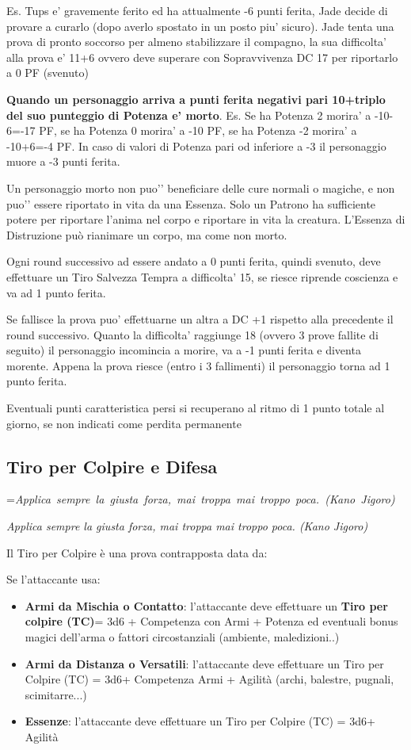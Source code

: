 \documentclass[a4paper,11pt,twoside,openany]{book}
\makeatletter
\newcommand{\mybox}[1]{%
	\setbox0=\hbox{#1}%
	\setlength{\@tempdima}{\dimexpr\wd0+13pt}%
	\begin{tcolorbox}[boxrule=0.5pt,arc=4pt, breakable,enhanced,
		left=6pt,right=6pt,top=6pt,bottom=6pt,boxsep=0pt,width=\@tempdima]
		#1
	\end{tcolorbox}
}
\makeatother
\begin{document}
Es. Tups e’ gravemente ferito ed ha attualmente -6 punti ferita, Jade decide di provare a curarlo (dopo averlo spostato in un posto piu’ sicuro). Jade tenta una prova di pronto soccorso per almeno stabilizzare il compagno, la sua difficolta’ alla prova e’ 11+6 ovvero deve superare con Sopravvivenza DC 17 per riportarlo a 0 PF (svenuto)

\textbf{Quando un personaggio arriva a punti ferita negativi pari 10+triplo del suo punteggio di Potenza e’ morto}. Es. Se ha Potenza 2 morira’ a -10-6=-17 PF, se ha Potenza 0 morira’ a -10 PF, se ha Potenza -2 morira’ a -10+6=-4 PF. In caso di valori di Potenza pari od inferiore a -3 il personaggio muore a -3 punti ferita.

\bigskip

Un personaggio morto non puo'’ beneficiare delle cure normali o magiche, e non puo'’ essere riportato in vita da una Essenza. Solo un Patrono ha sufficiente potere per riportare l’anima nel corpo e riportare in vita la creatura. L’Essenza di Distruzione può rianimare un corpo, ma come non morto.

Ogni round successivo ad essere andato a 0 punti ferita, quindi svenuto, deve effettuare un Tiro Salvezza Tempra a difficolta’ 15, se riesce riprende coscienza e va ad 1 punto ferita.

Se fallisce la prova puo’ effettuarne un altra a DC +1 rispetto alla precedente il round successivo. Quanto la difficolta’ raggiunge 18 (ovvero 3 prove fallite di seguito) il personaggio incomincia a morire, va a -1 punti ferita e diventa morente.
Appena la prova riesce (entro i 3 fallimenti) il personaggio torna ad 1 punto ferita.

Eventuali punti caratteristica persi si recuperano al ritmo di 1 punto totale al giorno, se non indicati come perdita permanente
\pagebreak

\subsection{Tiro per Colpire e Difesa}

\label{tiro-per-colpire}
\mybox{\textit{Applica sempre la giusta forza, mai troppa mai troppo poca. (Kano Jigoro)
}}\medskip

Il Tiro per Colpire è una prova contrapposta data da:

Se l'attaccante usa:

\begin{itemize}
	\item \textbf{Armi da Mischia o Contatto}: l'attaccante deve effettuare un \textbf{Tiro per colpire (TC)}= 3d6 + Competenza con Armi + Potenza ed eventuali bonus magici dell'arma o fattori circostanziali (ambiente, maledizioni..)
	\item
	\textbf{Armi da Distanza o Versatili}: l'attaccante deve effettuare un Tiro per Colpire (TC) = 3d6+ Competenza Armi + Agilità (archi, balestre, pugnali, scimitarre...)
	\item	\textbf{Essenze}: l'attaccante deve effettuare un Tiro per Colpire (TC) = 3d6+ Agilità 
\end{itemize}
\end{document}
